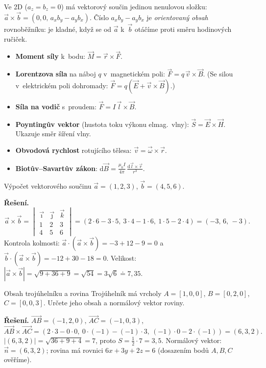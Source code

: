 \documentclass[a4paper,11pt]{article}
\newcommand{\abs}[1]{\left\lvert #1\right\rvert}
\newcommand{\ii}{\vec{\imath}}
\newcommand{\jj}{\vec{\jmath}}
\newcommand{\kk}{\vec{k}}
\newcommand{\dc}{{,}}                    %
\begin{document}
\begin{poznamka}
Ve 2D ($a_z=b_z=0$) má vektorový součin jedinou nenulovou složku:
$\vec a\times\vec b=(0,0,\,a_xb_y-a_yb_x)$. Číslo $a_xb_y-a_yb_x$ je \emph{orientovaný
obsah} rovnoběžníku: je kladné, když se od $\vec a$ k~$\vec b$ otáčíme proti směru
hodinových ručiček.
\end{poznamka}

\begin{ekt}
\begin{itemize}
  \item \textbf{Moment síly} k~bodu: $\vec M=\vec r\times\vec F$.
  \item \textbf{Lorentzova síla} na náboj $q$ v~magnetickém poli: $\vec F=q\,\vec v\times\vec B$.
        (Se silou v~elektrickém poli dohromady: $\vec F=q(\vec E+\vec v\times\vec B)$.)
  \item \textbf{Síla na vodič} s~proudem: $\vec F=I\,\vec l\times\vec B$.
  \item \textbf{Poyntingův vektor} (hustota toku výkonu elmag.\ vlny):
        $\vec S=\vec E\times\vec H$. Ukazuje směr šíření vlny.
  \item \textbf{Obvodová rychlost} rotujícího tělesa: $\vec v=\vec\omega\times\vec r$.
  \item \textbf{Biotův--Savartův zákon}: $\mathrm d\vec B=\frac{\mu_0 I}{4\pi}\,\frac{\mathrm d\vec l\times\vec r}{r^3}$.
\end{itemize}
\end{ekt}

\begin{priklad}{Výpočet vektorového součinu}
$\vec a=(1,2,3)$, $\vec b=(4,5,6)$.

\medskip\noindent\textbf{Řešení.}
\[
  \vec a\times\vec b=
  \begin{vmatrix}\ii&\jj&\kk\\1&2&3\\4&5&6\end{vmatrix}
  =(2\cdot6-3\cdot5,\ 3\cdot4-1\cdot6,\ 1\cdot5-2\cdot4)=(-3,\,6,\,-3).
\]
Kontrola kolmosti: $\vec a\cdot(\vec a\times\vec b)=-3+12-9=0$ a
$\vec b\cdot(\vec a\times\vec b)=-12+30-18=0$. \checkmark\quad
Velikost: $\abs{\vec a\times\vec b}=\sqrt{9+36+9}=\sqrt{54}=3\sqrt6\doteq7\dc35$.
\end{priklad}

\begin{priklad}{Obsah trojúhelníku a rovina}
Trojúhelník má vrcholy $A=[1,0,0]$, $B=[0,2,0]$, $C=[0,0,3]$. Určete jeho obsah
a normálový vektor roviny.

\medskip\noindent\textbf{Řešení.} $\overrightarrow{AB}=(-1,2,0)$, $\overrightarrow{AC}=(-1,0,3)$,
\[
  \overrightarrow{AB}\times\overrightarrow{AC}
  =(2\cdot3-0\cdot0,\ 0\cdot(-1)-(-1)\cdot3,\ (-1)\cdot0-2\cdot(-1))=(6,3,2).
\]
$\abs{(6,3,2)}=\sqrt{36+9+4}=7$, proto $S=\tfrac12\cdot7=3\dc5$.
Normálový vektor: $\vec n=(6,3,2)$; rovina má rovnici $6x+3y+2z=6$
(dosazením bodů $A,B,C$ ověříme). \checkmark
\end{priklad}
\end{document}
